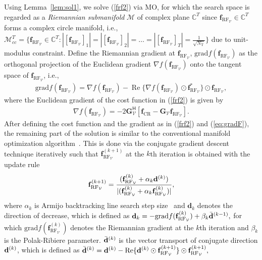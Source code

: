 \documentclass[journal,10pt]{IEEEtran}
\begin{document}
	Using Lemma~\ref{lem:sol1}, we solve (\ref{frf2}) via MO, for which the search space is regarded as a \textit{Riemannian submanifold} $\mathcal{M}$ of complex plane $\mathbb{C}^{T}$ since $\mathbf{f}_{\mathrm{RF}_\mathcal{V}}\in \mathbb{C}^{T}$ forms a complex circle manifold, i.e., $\mathcal{M}_{cc}^{T} = \{ \mathbf{f}_{\mathrm{RF}_\mathcal{V}}\in \mathbb{C}^{T} : |[\mathbf{f}_{\mathrm{RF}_\mathcal{V}}]_1| = |[\mathbf{f}_{\mathrm{RF}_\mathcal{V}}]_2|= \dots = |[\mathbf{f}_{\mathrm{RF}_\mathcal{V}}]_T| = \frac{1}{\sqrt{N_\mathrm{T}}}\} $ due to unit-modulus constraint. Define the Riemannian gradient at $\mathbf{f}_{\mathrm{RF}_\mathcal{V}}$, $\mathrm{grad}f(\mathbf{f}_{\mathrm{RF}_\mathcal{V}})$ as the orthogonal projection of the 
	Euclidean gradient $\nabla f(\mathbf{f}_{\mathrm{RF}_\mathcal{V}})$ onto the tangent space of $\mathbf{f}_{\mathrm{RF}_\mathcal{V}}$, i.e.,
	\begin{align}
	\mathrm{grad}f(\mathbf{f}_{\mathrm{RF}_\mathcal{V}}) =  \nabla f(\mathbf{f}_{\mathrm{RF}_\mathcal{V}}) - \operatorname{Re}\{ \nabla f(\mathbf{f}_{\mathrm{RF}_\mathcal{V}}) \odot \mathbf{f}_{\mathrm{RF}_\mathcal{V}}^* \} \odot \mathbf{f}_{\mathrm{RF}_\mathcal{V}},\nonumber
	\end{align}
	where the Euclidean gradient of the cost function in (\ref{frf2}) is given by
	\begin{align}
	\label{eq:gradF}
	\nabla f(\mathbf{f}_{\mathrm{RF}_\mathcal{V}}) = -2\mathbf{G}_\mathcal{V}^\textsf{H} [ {\mathbf{f}}_\mathrm{CR}- \mathbf{G}_\mathcal{V} \mathbf{f}_{\mathrm{RF}_\mathcal{V}} ].
	\end{align}
	After defining the cost function and the gradient as in (\ref{frf2}) and (\ref{eq:gradF}), the remaining part of the solution is similar to the conventional manifold optimization algorithm~\cite{manopt}. This is done via the conjugate gradient descent technique iteratively such that $\mathbf{f}_{\mathrm{RF}_\mathcal{V}}^{(k+1)}$ at the $k$th iteration is obtained with the update rule
	\begin{align}
	\label{Frf_update}
	\mathbf{f}_{\mathrm{RF}_\mathcal{V}}^{(k+1)} = \frac{ (\mathbf{f}_{\mathrm{RF}_\mathcal{V}}^{(k)} + \alpha_k {\bf d }^{(k)}) }  {|(\mathbf{f}_{\mathrm{RF}_\mathcal{V}}^{(k)} + \alpha_k \mathbf{f}_{\mathrm{RF}_\mathcal{V}}^{(k)})|},
	\end{align}
	where $\alpha_{k}$ is Armijo backtracking line search step size~\cite{manopt} and  $\mathbf{d}_k$ denotes the direction of decrease, which is defined as $	{\bf d}_{k} =- \mathrm{grad}f(\mathbf{f}_{\mathrm{RF}_\mathcal{V}}^{(k)}) + \beta_k \bar{\bf d}^{(k-1)},$	for which $\mathrm{grad}f(\mathbf{f}_{\mathrm{RF}_\mathcal{V}}^{(k)})$ denotes the Riemannian gradient at the $k$th iteration and $\beta_k$ is the Polak-Ribiere parameter. $\bar{\bf d}^{(k)}$ is the vector transport of conjugate direction ${\bf d}^{(k)}$, which is defined as $	\bar{\bf d}^{(k)} = {\bf d}^{(k)} - \operatorname{Re}\{{\bf d}^{(k)} \odot \mathbf{f}_{\mathrm{RF}_\mathcal{V}}^{(k+1)} \} \odot\mathbf{f}_{\mathrm{RF}_\mathcal{V}}^{(k+1)},$
\end{document}
